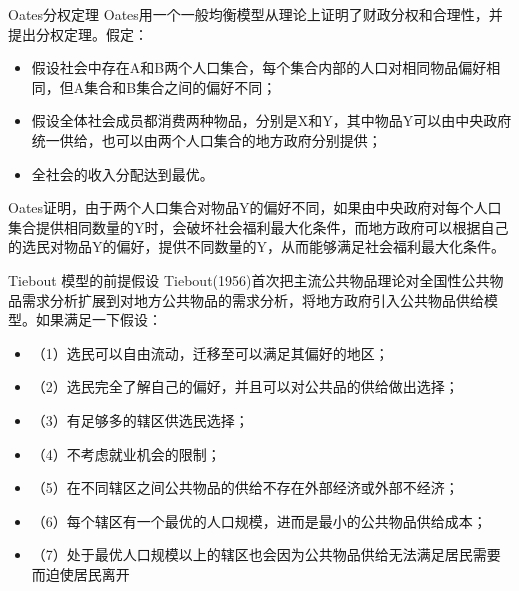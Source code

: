 \documentclass{beamer}
\begin{document}
\begin{frame}{Oates分权定理}
\label{oatesux5206ux6743ux5b9aux7406}
Oates用一个一般均衡模型从理论上证明了财政分权和合理性，并提出分权定理。假定：

\begin{itemize}[<+->]
\item
  假设社会中存在A和B两个人口集合，每个集合内部的人口对相同物品偏好相同，但A集合和B集合之间的偏好不同；
\item
  假设全体社会成员都消费两种物品，分别是X和Y，其中物品Y可以由中央政府统一供给，也可以由两个人口集合的地方政府分别提供；
\item
  全社会的收入分配达到最优。
\end{itemize}

Oates证明，由于两个人口集合对物品Y的偏好不同，如果由中央政府对每个人口集合提供相同数量的Y时，会破坏社会福利最大化条件，而地方政府可以根据自己的选民对物品Y的偏好，提供不同数量的Y，从而能够满足社会福利最大化条件。
\end{frame}

\begin{frame}{Tiebout 模型的前提假设}
\label{tiebout-ux6a21ux578bux7684ux524dux63d0ux5047ux8bbe}
Tiebout(1956)首次把主流公共物品理论对全国性公共物品需求分析扩展到对地方公共物品的需求分析，将地方政府引入公共物品供给模型。如果满足一下假设：

\begin{itemize}[<+->]
\item
  （1）选民可以自由流动，迁移至可以满足其偏好的地区；
\item
  （2）选民完全了解自己的偏好，并且可以对公共品的供给做出选择；
\item
  （3）有足够多的辖区供选民选择；
\item
  （4）不考虑就业机会的限制；
\item
  （5）在不同辖区之间公共物品的供给不存在外部经济或外部不经济；
\item
  （6）每个辖区有一个最优的人口规模，进而是最小的公共物品供给成本；
\item
  （7）处于最优人口规模以上的辖区也会因为公共物品供给无法满足居民需要而迫使居民离开
\end{itemize}
\end{frame}
\end{document}
